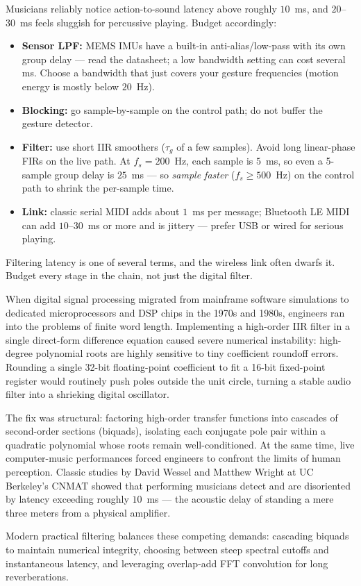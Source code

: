 \begin{goalbox}
Musicians reliably notice action-to-sound latency above roughly $10$~ms, and
$20$--$30$~ms feels sluggish for percussive playing. Budget accordingly:
\begin{itemize}
  \item \textbf{Sensor LPF:} MEMS IMUs have a built-in anti-alias/low-pass with
        its own group delay --- read the datasheet; a low bandwidth setting can
        cost several ms. Choose a bandwidth that just covers your gesture
        frequencies (motion energy is mostly below $20$~Hz).
  \item \textbf{Blocking:} go sample-by-sample on the control path; do not buffer
        the gesture detector.
  \item \textbf{Filter:} use short IIR smoothers ($\tau_g$ of a few samples).
        Avoid long linear-phase FIRs on the live path. At $f_s = 200$~Hz, each
        sample is $5$~ms, so even a 5-sample group delay is $25$~ms --- so
        \emph{sample faster} ($f_s \ge 500$~Hz) on the control path to shrink the
        per-sample time.
  \item \textbf{Link:} classic serial MIDI adds about $1$~ms per message;
        Bluetooth LE MIDI can add $10$--$30$~ms or more and is jittery ---
        prefer USB or wired for serious playing.
\end{itemize}
Filtering latency is one of several terms, and the wireless
link often dwarfs it. Budget every stage in the chain, not just the digital filter.
\end{goalbox}

\begin{historybox}
When digital signal processing migrated from mainframe software simulations to dedicated
microprocessors and DSP chips in the 1970s and 1980s, engineers ran into the
problems of finite word length. Implementing a high-order IIR filter in a single direct-form difference
equation caused severe numerical instability: high-degree polynomial roots are highly sensitive
to tiny coefficient roundoff errors. Rounding a single 32-bit floating-point coefficient to fit a
16-bit fixed-point register would routinely push poles outside the unit circle, turning a stable
audio filter into a shrieking digital oscillator.

The fix was structural: factoring high-order transfer functions into cascades of second-order
sections (biquads), isolating each conjugate pole pair within a quadratic polynomial whose roots
remain well-conditioned. At the same time, live computer-music performances forced engineers to confront the
limits of human perception. Classic studies by David Wessel and Matthew Wright at UC Berkeley's
CNMAT showed that performing musicians detect and are disoriented by latency exceeding roughly $10$~ms
--- the acoustic delay of standing a mere three meters from a physical amplifier.

Modern practical filtering balances these competing demands: cascading biquads to
maintain numerical integrity, choosing between steep spectral cutoffs and instantaneous latency,
and leveraging overlap-add FFT convolution for long reverberations.
\end{historybox}

